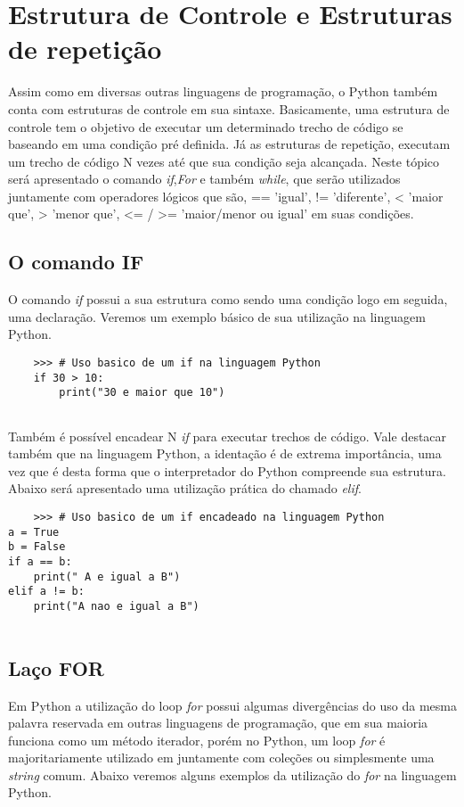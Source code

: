     \section{Estrutura de Controle e Estruturas de repetição}
Assim como em diversas outras linguagens de programação, o Python também conta com estruturas de controle em sua sintaxe. Basicamente, uma estrutura de controle tem o objetivo de executar um determinado trecho de código se baseando em uma condição pré definida. Já as estruturas de repetição, executam um trecho de código N vezes até que sua condição seja alcançada. Neste tópico será apresentado o comando \textit{if},\textit{For} e também \textit{while}, que serão utilizados juntamente com operadores lógicos que são, == 'igual', != 'diferente', < 'maior que', > 'menor que', <= / >= 'maior/menor ou igual' em suas condições. 

            \subsection{O comando IF}
O comando \textit{if} possui a sua estrutura como sendo uma condição logo em seguida, uma declaração. Veremos um exemplo básico de sua utilização na linguagem Python.
\begin{lstlisting}
	>>> # Uso basico de um if na linguagem Python
	if 30 > 10:
		print("30 e maior que 10")
	
\end{lstlisting} 
Também é possível encadear N \textit{if} para executar trechos de código. Vale destacar também que na linguagem Python, a identação é de extrema importância, uma vez que é desta forma que o interpretador do Python compreende sua estrutura. Abaixo será apresentado uma utilização prática do chamado \textit{elif}. 

\begin{lstlisting}
	>>> # Uso basico de um if encadeado na linguagem Python
a = True
b = False
if a == b:
	print(" A e igual a B")
elif a != b:
	print("A nao e igual a B")
	
\end{lstlisting} 

            \subsection{La\c{c}o FOR}
Em Python a utilização do loop \textit{for} possui algumas divergências do uso da mesma palavra reservada em outras linguagens de programação, que em sua maioria funciona como um método iterador, porém no Python, um loop \textit{for} é majoritariamente utilizado em juntamente com coleções ou simplesmente uma \textit{string} comum. Abaixo veremos alguns exemplos da utilização do \textit{for} na linguagem Python.
 
